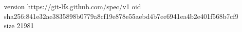 version https://git-lfs.github.com/spec/v1
oid sha256:841e32ae3835898b0779a8cf19e878e55aebd4b7ee6941ea4b2e401f568b7cf9
size 21981

